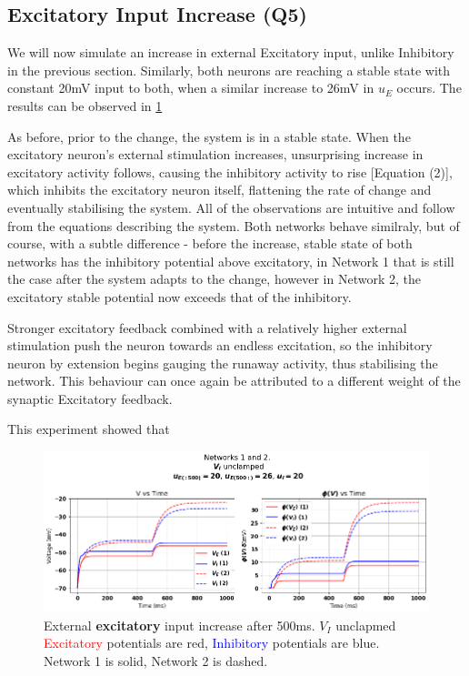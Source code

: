 \documentclass[10pt,twocolumn]{article}
\begin{document}
\subsection{Excitatory Input Increase (Q5)}
We will now simulate an increase in external Excitatory input, unlike Inhibitory
in the previous section. Similarly, both neurons are reaching a stable state
with constant 20mV input to both, when a similar increase to 26mV in $u_E$ occurs.
The results can be observed in \ref{fig:e-input-unclamped}

As before, prior to the change, the system is in a stable state. When the
excitatory neuron's external stimulation increases, unsurprising increase
in excitatory activity follows, causing the inhibitory activity to rise
[Equation (2)], which inhibits the excitatory neuron itself, flattening
the rate of change and eventually stabilising the system. 
All of the observations are intuitive and follow from the equations 
describing the system. Both networks behave similraly, but of course, 
with a subtle difference - before the increase, stable state of 
both networks has the inhibitory potential above excitatory, 
in Network 1 that is still the case after the system adapts to the
change, however in Network 2, the excitatory stable potential now
exceeds that of the inhibitory.

Stronger excitatory feedback combined with a relatively higher external 
stimulation push the neuron towards an endless excitation, so the 
inhibitory neuron by extension begins gauging the runaway activity,
thus stabilising the network. This behaviour can once again be
attributed to a different weight of the synaptic Excitatory feedback.

This experiment showed that 

\begin{figure}
    \centering
    \captionsetup{justification=centering}
    \includegraphics[width=1\textwidth]{images/12-E_input.png}
    \caption{External \textbf{excitatory} input increase after 500ms. $V_I$ unclapmed \\
        \textcolor{red}{Excitatory} potentials are red, \textcolor{blue}{Inhibitory} potentials are blue.\\
        Network 1 is solid, Network 2 is dashed.}
    \label{fig:e-input-unclamped}
\end{figure}
\end{document}

